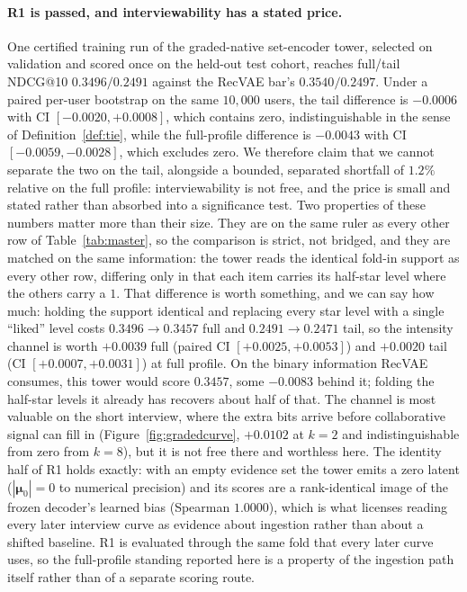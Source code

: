 \documentclass[acmsmall,review,anonymous]{acmart}
\newcommand{\bmu}{\boldsymbol{\mu}}
\begin{document}
\paragraph{R1 is passed, and interviewability has a stated price.} One certified training run of the graded-native set-encoder tower, selected on validation and scored once on the held-out test cohort, reaches full/tail NDCG@10 $\mathbf{0.3496/0.2491}$ against the RecVAE bar's $0.3540/0.2497$. Under a paired per-user bootstrap on the same $10{,}000$ users, the tail difference is $-0.0006$ with CI $[-0.0020,+0.0008]$, which contains zero, indistinguishable in the sense of Definition~\ref{def:tie}, while the full-profile difference is $-0.0043$ with CI $[-0.0059,-0.0028]$, which excludes zero. We therefore claim that we cannot separate the two on the tail, alongside a bounded, separated shortfall of $1.2\%$ relative on the full profile: interviewability is not free, and the price is small and stated rather than absorbed into a significance test. Two properties of these numbers matter more than their size. They are on the same ruler as every other row of Table~\ref{tab:master}, so the comparison is strict, not bridged, and they are matched on the same information: the tower reads the identical fold-in support as every other row, differing only in that each item carries its half-star level where the others carry a $1$. That difference is worth something, and we can say how much: holding the support identical and replacing every star level with a single ``liked'' level costs $0.3496\rightarrow0.3457$ full and $0.2491\rightarrow0.2471$ tail, so the intensity channel is worth $+0.0039$ full (paired CI $[+0.0025,+0.0053]$) and $+0.0020$ tail (CI $[+0.0007,+0.0031]$) at full profile. On the binary information RecVAE consumes, this tower would score $0.3457$, some $-0.0083$ behind it; folding the half-star levels it already has recovers about half of that. The channel is most valuable on the short interview, where the extra bits arrive before collaborative signal can fill in (Figure~\ref{fig:gradedcurve}, $+0.0102$ at $k{=}2$ and indistinguishable from zero from $k{=}8$), but it is not free there and worthless here. The identity half of R1 holds exactly: with an empty evidence set the tower emits a zero latent ($|\bmu_0|=0$ to numerical precision) and its scores are a rank-identical image of the frozen decoder's learned bias (Spearman $1.0000$), which is what licenses reading every later interview curve as evidence about ingestion rather than about a shifted baseline. R1 is evaluated through the same fold that every later curve uses, so the full-profile standing reported here is a property of the ingestion path itself rather than of a separate scoring route.
\end{document}
